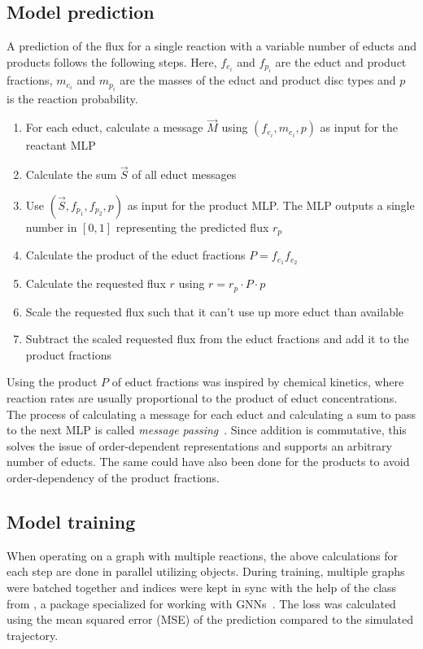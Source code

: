 \documentclass[a4paper]{scrartcl}
\begin{document}
\subsection{Model prediction}
A prediction of the flux for a single reaction with a variable number of educts and products follows the following steps. Here, $f_{e_i}$ and $f_{p_i}$ are the educt and product fractions, $m_{e_i}$ and $m_{p_i}$ are the masses of the educt and product disc types and $p$ is the reaction probability.

\begin{enumerate}
    \item For each educt, calculate a message $\vec{M}$ using $(f_{e_i}, m_{e_i}, p)$ as input for the reactant MLP
    \item Calculate the sum $\vec{S}$ of all educt messages
    \item Use $(\vec{S}, f_{p_1}, f_{p_2}, p)$ as input for the product MLP. The MLP outputs a single number in $[0, 1]$ representing the predicted flux $r_p$
    \item Calculate the product of the educt fractions $P = f_{e_1}f_{e_2}$
    \item Calculate the requested flux $r$ using $r = r_p\cdot P \cdot p$
    \item Scale the requested flux such that it can't use up more educt than available
    \item Subtract the scaled requested flux from the educt fractions and add it to the product fractions
\end{enumerate}

Using the product $P$ of educt fractions was inspired by chemical kinetics, where reaction rates are usually proportional to the product of educt concentrations. The process of calculating a message for each educt and calculating a sum to pass to the next MLP is called \textit{message passing}~\cite{wikipedia_gnn}. Since addition is commutative, this solves the issue of order-dependent representations and supports an arbitrary number of educts. The same could have also been done for the products to avoid order-dependency of the product fractions.

\subsection{Model training}
When operating on a graph with multiple reactions, the above calculations for each step are done in parallel utilizing  objects. During training, multiple graphs were batched together and indices were kept in sync with the help of the  class from , a package specialized for working with GNNs~\cite{fey2019}. The loss was calculated using the mean squared error (MSE) of the prediction compared to the simulated trajectory.
\end{document}

